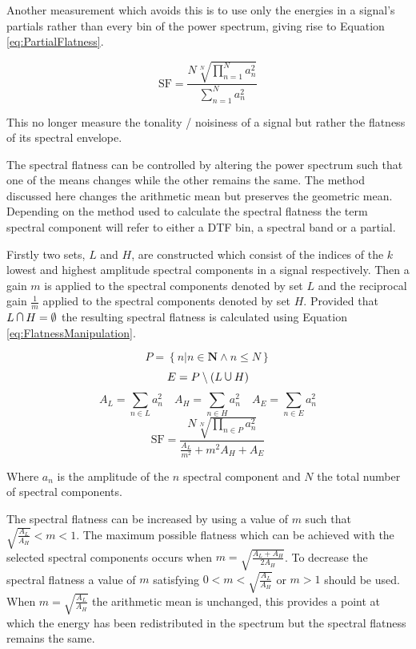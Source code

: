 		Another measurement which avoids this is to use only the energies in a signal's partials rather than every
		bin of the power spectrum, giving rise to Equation \ref{eq:PartialFlatness}.

		\begin{equation}
			\textrm{SF} = \frac{N\sqrt[N]{\prod_{n = 1}^{N} a_{n}^{2}}}
				           {\sum_{n = 1}^{N} a_{n}^{2}}
			\label{eq:PartialFlatness}
		\end{equation}

		This no longer measure the tonality / noisiness of a signal but rather the flatness of its spectral
		envelope.

		The spectral flatness can be controlled by altering the power spectrum such that one of the means changes
		while the other remains the same. The method discussed here changes the arithmetic mean but preserves the
		geometric mean. Depending on the method used to calculate the spectral flatness the term spectral component
		will refer to either a DTF bin, a spectral band or a partial.

		Firstly two sets, $L$ and $H$, are constructed which consist of the indices of the $k$ lowest and highest
		amplitude spectral components in a signal respectively. Then a gain $m$ is applied to the spectral
		components denoted by set $L$ and the reciprocal gain $\frac{1}{m}$ applied to the spectral components
		denoted by set $H$. Provided that $L \medcap H = \emptyset$ the resulting spectral flatness is calculated
		using Equation \ref{eq:FlatnessManipulation}.

		\[ P = \left\{ n | n \in \textbf{N} \land n \leq N \right\} \]
		\[ E = P \setminus (L \medcup H) \]
		\[ A_{L} = \sum_{n \in L} a_{n}^{2} \quad A_{H} = \sum_{n \in H} a_{n}^{2}
		   \quad A_{E} = \sum_{n \in E} a_{n}^{2} \]
		\begin{equation}
			\textrm{SF} = \frac{N\sqrt[N]{\prod_{n \in P} a_{n}^{2}}}
			                   {\frac{A_{L}}{m^{2}} + m^{2}A_{H} + A_{E}}
		  	\label{eq:FlatnessManipulation}
		\end{equation}

		Where $a_{n}$ is the amplitude of the $n$ spectral component and $N$ the total number of spectral
		components.
		
		The spectral flatness can be increased by using a value of $m$ such that $\sqrt{\frac{A_{L}}{A_{H}}} < m <
		1$. The maximum possible flatness which can be achieved with the selected spectral components occurs when $m
		= \sqrt{\frac{A_{L} + A_{H}}{2A_{H}}}$. To decrease the spectral flatness a value of $m$ satisfying $0 < m <
		\sqrt{\frac{A_{L}}{A_{H}}}$ or $m > 1$ should be used. When $m = \sqrt{\frac{A_{L}}{A_{H}}}$ the arithmetic
		mean is unchanged, this provides a point at which the energy has been redistributed in the spectrum but the
		spectral flatness remains the same.

